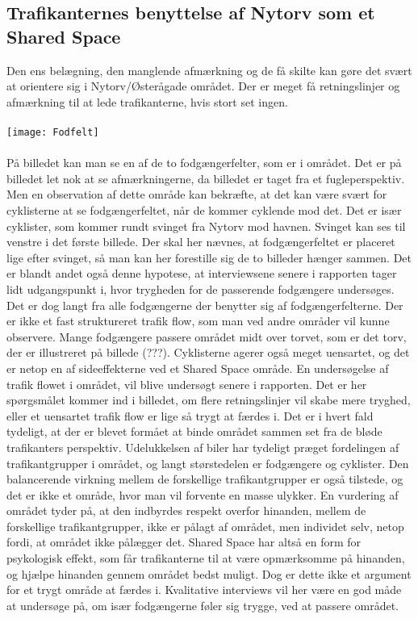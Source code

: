 \subsection{Trafikanternes benyttelse af Nytorv som et Shared Space}
\label{benyttelse_omrade}
Den ens belægning, den manglende afmærkning og de få skilte kan gøre det svært at orientere sig i Nytorv/Østerågade området. Der er meget få retningslinjer og afmærkning til at lede trafikanterne, hvis stort set ingen.
\\\\
\texttt{[image: Fodfelt]}
\\\\
På billedet kan man se en af de to fodgængerfelter, som er i området. Det er på billedet let nok at se afmærkningerne, da billedet er taget fra et fugleperspektiv. Men en observation af dette område kan bekræfte, at det kan være svært for cyklisterne at se fodgængerfeltet, når de kommer cyklende mod det. Det er især cyklister, som kommer rundt svinget fra Nytorv mod havnen. Svinget kan ses til venstre i det første billede. Der skal her nævnes, at fodgængerfeltet er placeret lige efter svinget, så man kan her forestille sig de to billeder hænger sammen. Det er blandt andet også denne hypotese, at interviewsene senere i rapporten tager lidt udgangspunkt i, hvor trygheden for de passerende fodgængere undersøges. 
Det er dog langt fra alle fodgængerne der benytter sig af fodgængerfelterne. Der er ikke et fast struktureret trafik flow, som man ved andre områder vil kunne observere. Mange fodgængere passere området midt over torvet, som er det torv, der er illustreret på billede (???). Cyklisterne agerer også meget uensartet, og det er netop en af sideeffekterne ved et Shared Space område. En undersøgelse af trafik flowet i området, vil blive undersøgt senere i rapporten. Det er her spørgsmålet kommer ind i billedet, om flere retningslinjer vil skabe mere tryghed, eller et uensartet trafik flow er lige så trygt at færdes i. Det er i hvert fald tydeligt, at der er blevet formået at binde området sammen set fra de bløde trafikanters perspektiv. Udelukkelsen af biler har tydeligt præget fordelingen af trafikantgrupper i området, og langt størstedelen er fodgængere og cyklister. Den balancerende virkning mellem de forskellige trafikantgrupper er også tilstede, og det er ikke et område, hvor man vil forvente en masse ulykker. En vurdering af området tyder på, at den indbyrdes respekt overfor hinanden, mellem de forskellige trafikantgrupper, ikke er pålagt af området, men individet selv, netop fordi, at området ikke pålægger det. Shared Space har altså en form for psykologisk effekt, som får trafikanterne til at være opmærksomme på hinanden, og hjælpe hinanden gennem området bedst muligt. Dog er dette ikke et argument for et trygt område at færdes i. Kvalitative interviews vil her være en god måde at undersøge på, om især fodgængerne føler sig trygge, ved at passere området.
